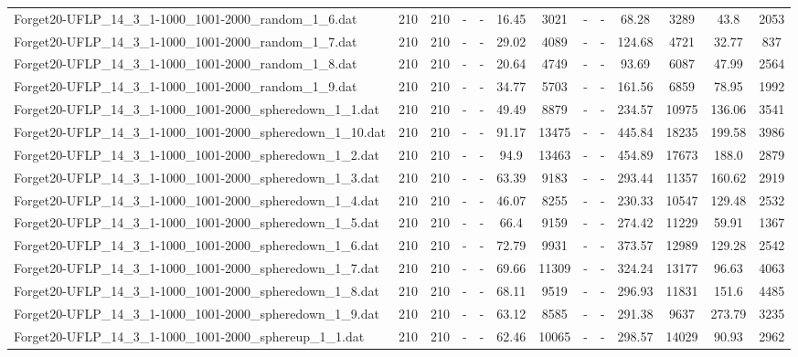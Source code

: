 \begin{table}[!ht]
{\begin{tabular}{lcccccccccccc}
Forget20-UFLP\_14\_3\_1-1000\_1001-2000\_random\_1\_6.dat & 210 & 210 &  - &  - & 16.45 & 3021 &  - &  - & 68.28 & 3289 & 43.8 & 2053 \\
Forget20-UFLP\_14\_3\_1-1000\_1001-2000\_random\_1\_7.dat & 210 & 210 &  - &  - & 29.02 & 4089 &  - &  - & 124.68 & 4721 & 32.77 & 837 \\
Forget20-UFLP\_14\_3\_1-1000\_1001-2000\_random\_1\_8.dat & 210 & 210 &  - &  - & 20.64 & 4749 &  - &  - & 93.69 & 6087 & 47.99 & 2564 \\
Forget20-UFLP\_14\_3\_1-1000\_1001-2000\_random\_1\_9.dat & 210 & 210 &  - &  - & 34.77 & 5703 &  - &  - & 161.56 & 6859 & 78.95 & 1992 \\
Forget20-UFLP\_14\_3\_1-1000\_1001-2000\_spheredown\_1\_1.dat & 210 & 210 &  - &  - & 49.49 & 8879 &  - &  - & 234.57 & 10975 & 136.06 & 3541 \\
Forget20-UFLP\_14\_3\_1-1000\_1001-2000\_spheredown\_1\_10.dat & 210 & 210 &  - &  - & 91.17 & 13475 &  - &  - & 445.84 & 18235 & 199.58 & 3986 \\
Forget20-UFLP\_14\_3\_1-1000\_1001-2000\_spheredown\_1\_2.dat & 210 & 210 &  - &  - & 94.9 & 13463 &  - &  - & 454.89 & 17673 & 188.0 & 2879 \\
Forget20-UFLP\_14\_3\_1-1000\_1001-2000\_spheredown\_1\_3.dat & 210 & 210 &  - &  - & 63.39 & 9183 &  - &  - & 293.44 & 11357 & 160.62 & 2919 \\
Forget20-UFLP\_14\_3\_1-1000\_1001-2000\_spheredown\_1\_4.dat & 210 & 210 &  - &  - & 46.07 & 8255 &  - &  - & 230.33 & 10547 & 129.48 & 2532 \\
Forget20-UFLP\_14\_3\_1-1000\_1001-2000\_spheredown\_1\_5.dat & 210 & 210 &  - &  - & 66.4 & 9159 &  - &  - & 274.42 & 11229 & 59.91 & 1367 \\
Forget20-UFLP\_14\_3\_1-1000\_1001-2000\_spheredown\_1\_6.dat & 210 & 210 &  - &  - & 72.79 & 9931 &  - &  - & 373.57 & 12989 & 129.28 & 2542 \\
Forget20-UFLP\_14\_3\_1-1000\_1001-2000\_spheredown\_1\_7.dat & 210 & 210 &  - &  - & 69.66 & 11309 &  - &  - & 324.24 & 13177 & 96.63 & 4063 \\
Forget20-UFLP\_14\_3\_1-1000\_1001-2000\_spheredown\_1\_8.dat & 210 & 210 &  - &  - & 68.11 & 9519 &  - &  - & 296.93 & 11831 & 151.6 & 4485 \\
Forget20-UFLP\_14\_3\_1-1000\_1001-2000\_spheredown\_1\_9.dat & 210 & 210 &  - &  - & 63.12 & 8585 &  - &  - & 291.38 & 9637 & 273.79 & 3235 \\
Forget20-UFLP\_14\_3\_1-1000\_1001-2000\_sphereup\_1\_1.dat & 210 & 210 &  - &  - & 62.46 & 10065 &  - &  - & 298.57 & 14029 & 90.93 & 2962 \\

\end{tabular}}
\end{table}
